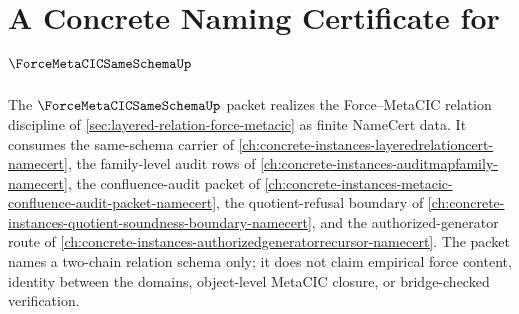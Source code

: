 \chapter{A Concrete Naming Certificate for $\ForceMetaCICSameSchemaUp$}
\label{ch:concrete-instances-force-metacic-same-schema-namecert}

The $\ForceMetaCICSameSchemaUp$ packet realizes the Force--MetaCIC relation discipline of \autoref{sec:layered-relation-force-metacic} as finite NameCert data. It consumes the same-schema carrier of \autoref{ch:concrete-instances-layeredrelationcert-namecert}, the family-level audit rows of \autoref{ch:concrete-instances-auditmapfamily-namecert}, the confluence-audit packet of \autoref{ch:concrete-instances-metacic-confluence-audit-packet-namecert}, the quotient-refusal boundary of \autoref{ch:concrete-instances-quotient-soundness-boundary-namecert}, and the authorized-generator route of \autoref{ch:concrete-instances-authorizedgeneratorrecursor-namecert}. The packet names a two-chain relation schema only; it does not claim empirical force content, identity between the domains, object-level MetaCIC closure, or bridge-checked verification.

